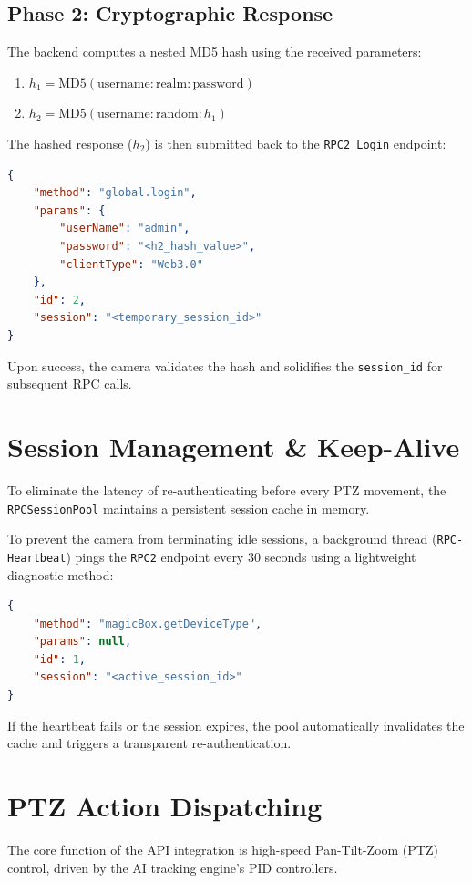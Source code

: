 \documentclass[12pt,a4paper]{article}
\begin{document}
\subsection{Phase 2: Cryptographic Response}
The backend computes a nested MD5 hash using the received parameters:
\begin{enumerate}
    \item $h_1 = \text{MD5}(\text{username} : \text{realm} : \text{password})$
    \item $h_2 = \text{MD5}(\text{username} : \text{random} : h_1)$
\end{enumerate}

The hashed response ($h_2$) is then submitted back to the \texttt{RPC2\_Login} endpoint:
\begin{lstlisting}[style=jsonstyle, language=json, caption=Phase 2 Request]
{
    "method": "global.login",
    "params": {
        "userName": "admin",
        "password": "<h2_hash_value>",
        "clientType": "Web3.0"
    },
    "id": 2,
    "session": "<temporary_session_id>"
}
\end{lstlisting}
Upon success, the camera validates the hash and solidifies the \texttt{session\_id} for subsequent RPC calls.

\section{Session Management \& Keep-Alive}
To eliminate the latency of re-authenticating before every PTZ movement, the \texttt{RPCSessionPool} maintains a persistent session cache in memory. 

To prevent the camera from terminating idle sessions, a background thread (\texttt{RPC-Heartbeat}) pings the \texttt{RPC2} endpoint every 30 seconds using a lightweight diagnostic method:
\begin{lstlisting}[style=jsonstyle, language=json, caption=Heartbeat Request]
{
    "method": "magicBox.getDeviceType",
    "params": null,
    "id": 1,
    "session": "<active_session_id>"
}
\end{lstlisting}
If the heartbeat fails or the session expires, the pool automatically invalidates the cache and triggers a transparent re-authentication.

\section{PTZ Action Dispatching}
The core function of the API integration is high-speed Pan-Tilt-Zoom (PTZ) control, driven by the AI tracking engine's PID controllers.
\end{document}

